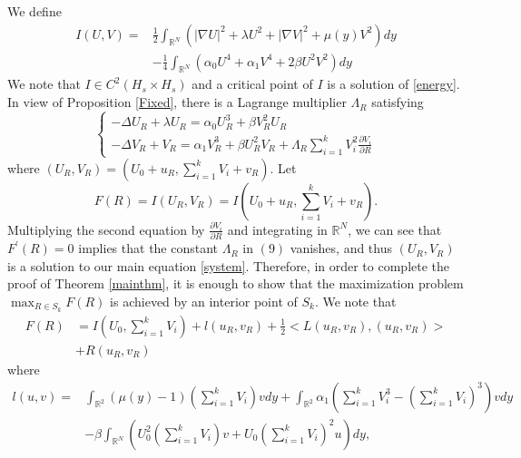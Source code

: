 \documentclass{amsart}
\theoremstyle{definition}
\theoremstyle{remark}
\numberwithin{equation}{section}
\begin{document}
 
 We define
\begin{equation}
\begin{aligned}\label{energy}
I(U, V)=& \frac{1}{2} \int_{\mathbb{R}^{N}}\left(|\nabla U|^{2}+\lambda U^{2}+|\nabla V|^{2}+\mu(y) V^{2}\right) d y \\
&-\frac{1}{4} \int_{\mathbb{R}^{N}}\left(\alpha_0 U^{4}+\alpha_1 V^{4}+2 \beta U^{2} V^{2}\right) d y
\end{aligned}
\end{equation}
We note that $I \in C^{2}\left(H_{s} \times H_{s}\right)$ and a critical point of $I$ is a solution of \eqref{energy}. 
In view of Proposition \ref{Fixed}, there is a Lagrange multiplier $\Lambda_{R}$ satisfying
\begin{equation}
\left\{\begin{array}{l}
-\Delta U_{R}+\lambda U_{R}=\alpha_0 U_{R}^{3}+\beta V_{R}^{2} U_{R} \\
-\Delta V_{R}+V_{R}=\alpha_1 V_{R}^{3}+\beta U_{R}^{2} V_{R}+\Lambda_{R} \sum_{i=1}^{k} V_{i}^{2} \frac{\partial V_{i}}{\partial R}
\end{array}\right.
\end{equation}
where $\left(U_{R}, V_{R}\right)=\left(U_{0}+u_{R}, \sum_{i=1}^{k} V_{i}+v_{R}\right)$. Let
\begin{equation}\label{def_F}
F(R)=I(U_R,V_R)=I\left(U_{0}+u_{R}, \sum_{i=1}^{k} V_{i}+v_{R}\right).\end{equation} Multiplying the second equation by $\frac{\partial V_{i}}{\partial R}$
and integrating in $\mathbb{R}^{N}$, we can see that $F^{\prime}(R)=0$ implies that the constant $\Lambda_{R}$ in $(9)$ vanishes, and thus $\left(U_{R}, V_{R}\right)$ is a solution to our main equation \eqref{system}. Therefore, in order to complete the proof of Theorem \ref{mainthm}, it is enough to show that the maximization problem $\max _{R \in S_{k}} F(R)$ is achieved by an interior point of $S_{k}$.  We note that
\begin{equation}\begin{aligned}\label{FR}
F(R)&=I\left(U_{0}, \sum_{i=1}^{k} V_{i}\right)+l\left(u_{R}, v_{R}\right)+\frac{1}{2}<L\left(u_{R}, v_{R}\right),\left(u_{R}, v_{R}\right)>\\&+R\left(u_{R}, v_{R}\right)
\end{aligned}\end{equation}
where
\begin{equation}
\begin{aligned}
l(u, v)=& \int_{\mathbb{R}^{2}}(\mu(y)-1)\left(\sum_{i=1}^{k} V_{i}\right) v d y  +\int_{\mathbb{R}^{2}}\alpha_1\left(\sum_{i=1}^{k} V_{i}^{3}-\left(\sum_{i=1}^{k} V_{i}\right)^{3}\right) v d y \\
&-\beta \int_{\mathbb{R}^{N}}\left(U_{0}^{2}\left(\sum_{i=1}^{k} V_{i}\right) v+U_{0}\left(\sum_{i=1}^{k} V_{i}\right)^{2} u\right) d y,
\end{aligned}
\end{equation}
\end{document}
